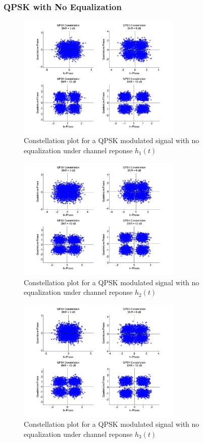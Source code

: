 \documentclass[]{article}
\begin{document}
\subsubsection{QPSK with No Equalization}

\begin{figure}[H]
\centering
\includegraphics[width=0.7\textwidth]{qpConst1.jpg}
\caption{Constellation plot for a QPSK modulated signal with no equalization under channel reponse $h_1(t)$}
\end{figure}

\begin{figure}[H]
\centering
\includegraphics[width=0.7\textwidth]{qpConst2.jpg}
\caption{Constellation plot for a QPSK modulated signal with no equalization under channel reponse $h_2(t)$}
\end{figure}

\begin{figure}[H]
\centering
\includegraphics[width=0.7\textwidth]{qpConst3.jpg}
\caption{Constellation plot for a QPSK modulated signal with no equalization under channel reponse $h_3(t)$}
\end{figure}
\end{document}
